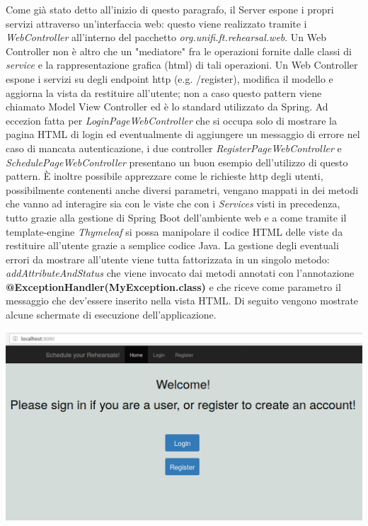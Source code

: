 Come già stato detto all'inizio di questo paragrafo, il Server espone i propri servizi attraverso un'interfaccia web: questo viene realizzato tramite i \textsl{WebController} all'interno del pacchetto \textsl{org.unifi.ft.rehearsal.web}.\newline\newline
Un Web Controller non è altro che un "mediatore" fra le operazioni fornite dalle classi di \textsl{service} e la rappresentazione grafica (html) di tali operazioni. Un Web Controller espone i servizi su degli endpoint http (e.g. /register), modifica il modello e aggiorna la vista da restituire all'utente; non a caso questo pattern viene chiamato Model View Controller ed è lo standard utilizzato da Spring.\newline
Ad eccezion fatta per \textsl{LoginPageWebController} che si occupa solo di mostrare la pagina HTML di login ed eventualmente di aggiungere un messaggio di errore nel caso di mancata autenticazione, i due controller \textsl{RegisterPageWebController} e \textsl{SchedulePageWebController} presentano un buon esempio dell'utilizzo di questo pattern. È inoltre possibile apprezzare come le richieste http degli utenti, possibilmente contenenti anche diversi parametri, vengano mappati in dei metodi che vanno ad interagire sia con le viste che con i \textsl{Services} visti in precedenza, tutto grazie alla gestione di Spring Boot dell'ambiente web e a come tramite il template-engine \textsl{Thymeleaf} si possa manipolare il codice HTML delle viste da restituire all'utente grazie a semplice codice Java.\newline
La gestione degli eventuali errori da mostrare all'utente viene tutta fattorizzata in un singolo metodo: \textsl{addAttributeAndStatus} che viene invocato dai metodi annotati con l'annotazione \textbf{@ExceptionHandler(MyException.class)} e che riceve come parametro il messaggio che dev'essere inserito nella vista HTML.\newline\newline
Di seguito vengono mostrate alcune schermate di esecuzione dell'applicazione.

\begin{minipage}{\linewidth}
	\includegraphics[width=\textwidth]{img/homepage.png}
\end{minipage}

